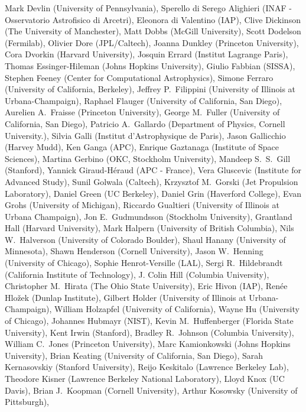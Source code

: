 Mark Devlin (University of Pennsylvania),
Sperello di Serego Alighieri (INAF - Osservatorio Astrofisico di Arcetri),
Eleonora di Valentino (IAP),
Clive Dickinson (The University of Manchester),
Matt Dobbs (McGill University),
Scott Dodelson (Fermilab),
Olivier Dore (JPL/Caltech),
Joanna Dunkley (Princeton University),
Cora Dvorkin (Harvard University),
Josquin Errard (Institut Lagrange Paris),
Thomas Essinger-Hileman (Johns Hopkins University), 
Giulio Fabbian (SISSA),
Stephen Feeney (Center for Computational Astrophysics),
Simone Ferraro (University of California, Berkeley),
Jeffrey P.~Filippini (University of Illinois at Urbana-Champaign),
Raphael Flauger (University of California, San Diego),
Aurelien A.~Fraisse (Princeton University),
George M.~Fuller (University of California, San Diego),
Patricio A.~Gallardo (Department of Physics, Cornell University.),
Silvia Galli (Institut d'Astrophysique de Paris),
Jason Gallicchio (Harvey Mudd),
Ken Ganga (APC),
Enrique Gaztanaga (Institute of Space Sciences),
Martina Gerbino (OKC, Stockholm University),
Mandeep S.~S.~Gill (Stanford),
Yannick Giraud-Héraud (APC - France),
Vera Gluscevic (Institute for Advanced Study),
Sunil Golwala (Caltech),
Krzysztof M.~Gorski (Jet Propulsion Laboratory),
Daniel Green (UC Berkeley),
Daniel Grin (Haverford College),
Evan Grohs (University of Michigan),
Riccardo Gualtieri (University of Illinois at Urbana Champaign),
Jon E.~Gudmundsson (Stockholm University),
Grantland Hall (Harvard University),
Mark Halpern (University of British Columbia),
Nils W.~Halverson (University of Colorado Boulder),
Shaul Hanany (University of Minnesota),
Shawn Henderson (Cornell University),
Jason W.~Henning (University of Chicago),
Sophie Henrot-Versille (LAL),
Sergi R.~Hildebrandt (California Institute of Technology),
J. Colin Hill (Columbia University),
Christopher M.~Hirata (The Ohio State University),
Eric Hivon (IAP),
Ren\'{e}e Hlo\v{z}ek (Dunlap Institute),
Gilbert Holder (University of Illinois at Urbana-Champaign),
William Holzapfel (University of California),
Wayne Hu (University of Chicago),
Johannes Hubmayr (NIST),
Kevin M.~Huffenberger (Florida State University),
Kent Irwin (Stanford),
Bradley R.~Johnson (Columbia University),
William C.~Jones (Princeton University),
Marc Kamionkowski (Johns Hopkins University),
Brian Keating (University of California, San Diego),
Sarah Kernasovskiy (Stanford University),
Reijo Keskitalo (Lawrence Berkeley Lab),
Theodore Kisner (Lawrence Berkeley National Laboratory),
Lloyd Knox (UC Davis),
Brian J.~Koopman (Cornell University),
Arthur Kosowsky (University of Pittsburgh),
